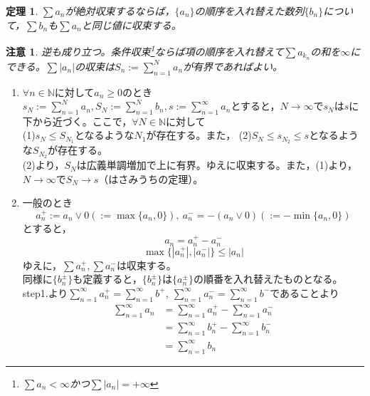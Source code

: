 \documentclass[dvipdfmx,a4j,10pt]{jsarticle}
\makeatletter
\theoremstyle{mystyle1}
\newtheorem{thm}[dfn]{定理}
\theoremstyle{mystyle2}
\newtheorem{note}{注意}
\renewenvironment{proof}[1][\proofname]{\par
  \pushQED{\qed}%
  \normalfont
  \topsep6\p@\@plus6\p@ \trivlist
  \item[\hskip\labelsep{\bfseries\sffamily #1}]\ignorespaces
}{%
  \popQED\endtrivlist\@endpefalse
}
\renewcommand\proofname{証明}
\makeatother
\begin{document}
\newpage

\begin{framed}
	\begin{thm}\label{thm4.8}
		$\displaystyle\sum a_n$が絶対収束するならば，$\{a_n\}$の順序を入れ替えた数列$\{b_n\}$について，$\displaystyle\sum b_n$も$\displaystyle \sum a_n$と同じ値に収束する。
	\end{thm}
\end{framed}

\begin{note}
    逆も成り立つ。条件収束\footnote{$\displaystyle\sum a_n<\infty$かつ$\displaystyle \sum |a_n|=+\infty$}ならば項の順序を入れ替えて$\displaystyle\sum a_{k_n}$の和を$\infty$にできる。$\displaystyle\sum |a_n|$の収束は$\displaystyle S_n:=\sum_{n=1}^N a_n$が有界であればよい。
\end{note}

\begin{proof}[定理\ref{thm4.8}の証明]
    \begin{enumerate}
    \renewcommand{\labelenumi}{Step\arabic{enumi}.}
    \item $\forall n\in\mathbb{N}$に対して$a_n\geq0$のとき\\
    	$\displaystyle s_N:=\sum_{n=1}^N a_n, S_N:=\sum_{n=1}^N b_n, s:=\sum_{n=1}^\infty a_n $とすると，$N\to\infty$で$s_N$は$s$に下から近づく。ここで，$\forall N\in\mathbb{N}$に対して\\
        (1)$s_N\leq S_{N_1}$となるような$N_1$が存在する。また，
        (2)$S_N\leq s_{N_2}\leq s$となるような$S_{N_2}$が存在する。\\
        (2)より，$S_N$は広義単調増加で上に有界。ゆえに収束する。また，(1)より，$N\to\infty$で$S_N\to s$（はさみうちの定理）。
    \item 一般のとき
    	\[a_n^+:=a_n\lor0(:=\max\{a_n,0\}),\ a_n^-=-(a_n\lor0)(:=-\min\{a_n,0\})\]
    	とすると，
    	\[a_n=a_n^+-a_n^-\]
    	\[\max\{|a_n^+|,|a_n^-|\}\leq|a_n|\]
    	ゆえに，$\displaystyle \sum a_n^+,\sum a_n^-$は収束する。\\
    	同様に$\{b_n^\pm\}$も定義すると，$\{b_n^\pm\}$は$\{a_n^\pm\}$の順番を入れ替えたものとなる。step1.より$\displaystyle \sum_{n=1}^\infty a_n^+ = \sum_{n=1}^\infty b^+,\ \sum_{n=1}^\infty a_n^- = \sum_{n=1}^\infty b^-$であることより
    	\[
    	\begin{split}
    		\sum_{n=1}^\infty a_n&= \sum_{n=1}^\infty a_n^+ - \sum_{n=1}^\infty a_n^-\\
    		&= \sum_{n=1}^\infty b_n^+ - \sum_{n=1}^\infty b_n^-\\
    		&= \sum_{n=1}^\infty b_n
    	\end{split}
    	\]
    \end{enumerate}
\end{proof}
\end{document}
